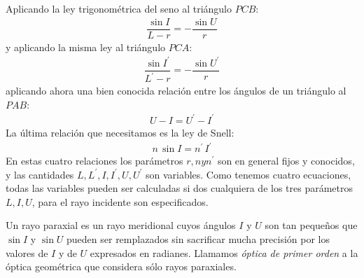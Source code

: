 \documentclass[14pt]{extarticle}
\begin{document}
Aplicando la ley trigonométrica del seno al triángulo $PCB$:
\begin{align}
\dfrac{\sin I}{L - r} = - \dfrac{\sin U}{r}
\label{eq:ecuacion_I_20}
\end{align}
y aplicando la misma ley al triángulo $PCA$:
\begin{align}
\dfrac{\sin I^{\prime}}{L^{\prime} - r} = - \dfrac{\sin U^{\prime}}{r}
\label{eq:ecuacion_I_21}
\end{align}
aplicando ahora una bien conocida relación entre los ángulos de un triángulo al $PAB$:
\begin{align}
U - I = U^{\prime} - I^{\prime}
\label{eq:ecuacion_I_22}
\end{align}
La última relación que necesitamos es la ley de Snell:
\begin{align}
n \, \sin I = n^{\prime} \, I^{\prime}
\label{eq:ecuacion_I_23}
\end{align}
En estas cuatro relaciones los parámetros $r, n y n^{\prime}$ son en general fijos y conocidos, y las cantidades $L, L^{\prime}, I, I^{\prime}, U, U^{\prime}$ son variables. Como tenemos cuatro ecuaciones, todas las variables pueden ser calculadas si dos cualquiera de los tres parámetros $L, I, U$, para el rayo incidente son especificados.

Un rayo paraxial es un rayo meridional cuyos ángulos $I$ y $U$ son tan pequeños que $\sin I$ y $\sin U$ pueden ser remplazados sin sacrificar mucha precisión por los valores de $I$ y de $U$ expresados en radianes. Llamamos \textit{óptica de primer orden} a la óptica geométrica que considera sólo rayos paraxiales. 
\end{document}
